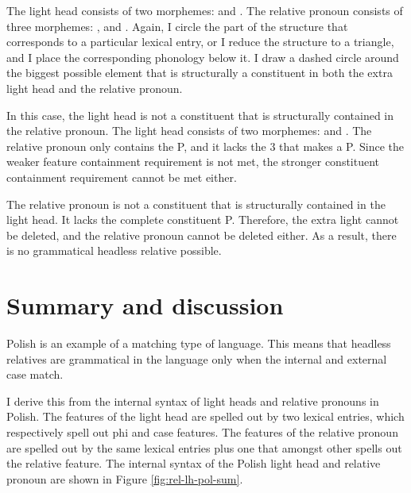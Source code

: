 The light head consists of two morphemes:  and .
The relative pronoun consists of three morphemes: ,  and .
Again, I circle the part of the structure that corresponds to a particular lexical entry, or I reduce the structure to a triangle, and I place the corresponding phonology below it.
I draw a dashed circle around the biggest possible element that is structurally a constituent in both the extra light head and the relative pronoun.

In this case, the light head is not a constituent that is structurally contained in the relative pronoun.
The light head consists of two morphemes:  and .
The relative pronoun only contains the P, and it lacks the 3 that makes a P. Since the weaker feature containment requirement is not met, the stronger constituent containment requirement cannot be met either.

The relative pronoun is not a constituent that is structurally contained in the light head. It lacks the complete constituent P.
Therefore, the extra light cannot be deleted, and the relative pronoun cannot be deleted either.
As a result, there is no grammatical headless relative possible.

\section{Summary and discussion}

Polish is an example of a matching type of language. This means that headless relatives are grammatical in the language only when the internal and external case match.

I derive this from the internal syntax of light heads and relative pronouns in Polish. The features of the light head are spelled out by two lexical entries, which respectively spell out phi and case features. The features of the relative pronoun are spelled out by the same lexical entries plus one that amongst other spells out the relative feature. The internal syntax of the Polish light head and relative pronoun are shown in Figure \ref{fig:rel-lh-pol-sum}.

